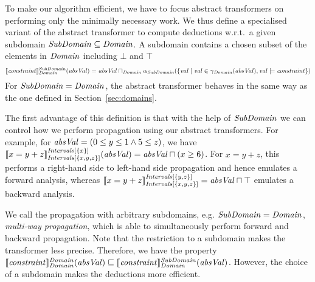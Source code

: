 To make our algorithm efficient, we have to focus abstract
transformers on performing only the minimally necessary
work. 
%
We thus define a specialised variant of the abstract transformer to compute
deductions w.r.t.\ a given subdomain $\subdomain\subseteq \domain$.
A subdomain contains a chosen subset of the elements in $\domain$ including $\bot$ and $\top$
\begin{equation}\label{eq:at2}
\abstrans{\domain}{\constraint}^\subdomain(\absval)=\absval\meet_\domain \alpha_\subdomain(\{\val\mid \val\in\gamma_\domain(\absval), \val\models \constraint\})
\end{equation}
For $\subdomain=\domain$, the abstract transformer behaves in the same way as the one defined in Section~\ref{sec:domains}.

%

The first advantage of this definition is that with the help of $\subdomain$
we can control how we perform propagation using our abstract transformers.
%
For example, for $\absval=(0\leq y \leq 1 \wedge 5\leq z)$, we have
$\abstrans{\intervals[\{x,y,z\}]}{x=y+z}^{\intervals[\{x\}]}(\absval)=\absval\meet(x\geq
6)$. For $x=y+z$, this performs a right-hand side to left-hand side propagation and
hence emulates a forward analysis, whereas
$\abstrans{\intervals[\{x,y,z\}]}{x=y+z}^{\intervals[\{y,z\}]}=\absval\meet\top$
emulates a backward analysis.

We call the propagation with arbitrary subdomains,
e.g. $\subdomain=\domain$, \emph{multi-way propagation}, which is able
to simultaneously perform forward and backward propagation.
%
Note that the restriction to a subdomain makes the transformer less
precise. Therefore, we have the property
$\abstrans{\domain}{\constraint}^\domain(\absval)\sqsubseteq
\abstrans{\domain}{\constraint}^\subdomain(\absval)$.
However, the choice of a subdomain makes the deductions more efficient.

